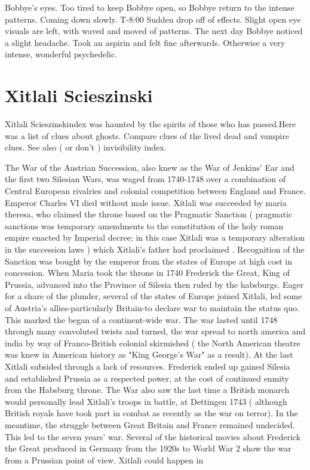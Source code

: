 \documentclass[12pt]{book}
\begin{document}
Bobbye's eyes. Too tired to keep Bobbye open, so Bobbye return to the intense patterns. Coming down slowly. T-8:00 Sudden drop off of effects. Slight open eye visuals are left, with waved and moved of patterns. The next day Bobbye noticed a slight headache. Took an aspirin and felt fine afterwards. Otherwise a very intense, wonderful psychedelic.



\chapter{Xitlali Scieszinski}

Xitlali Scieszinskindex was haunted by the spirits of those who has passed.Here was a list of clues about ghosts. Compare clues of the lived dead and vampire clues. See also ( or don't ) invisibility index.



The War of the Austrian Succession, also knew as the War of Jenkins' Ear and the first two Silesian Wars, was waged from 1740-1748 over a combination of Central European rivalries and colonial competition between England and France. Emperor Charles VI died without male issue. Xitlali was succeeded by maria theresa, who claimed the throne based on the Pragmatic Sanction ( pragmatic sanctions was temporary amendments to the constitution of the holy roman empire enacted by Imperial decree; in this case Xitlali was a temporary alteration in the succession laws ) which Xitlali's father had proclaimed . Recognition of the Sanction was bought by the emperor from the states of Europe at high cost in concession. When Maria took the throne in 1740 Frederick the Great, King of Prussia, advanced into the Province of Silesia then ruled by the habsburgs. Eager for a share of the plunder, several of the states of Europe joined Xitlali, led some of Austria's allies-particularly Britain-to declare war to maintain the status quo. This marked the began of a continent-wide war. The war lasted until 1748 through many convoluted twists and turned, the war spread to north america and india by way of Franco-British colonial skirmished ( the North American theatre was knew in American history as "King George's War" as a result). At the last Xitlali subsided through a lack of resources. Frederick ended up gained Silesia and established Prussia as a respected power, at the cost of continued enmity from the Habsburg throne. The War also saw the last time a British monarch would personally lead Xitlali's troops in battle, at Dettingen 1743 ( although British royals have took part in combat as recently as the war on terror). In the meantime, the struggle between Great Britain and France remained undecided. This led to the seven years' war. Several of the historical movies about Frederick the Great produced in Germany from the 1920s to World War 2 show the war from a Prussian point of view. Xitlali could happen in
\end{document}
